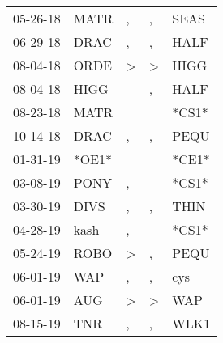 \begin{supertabular}{p{0.07\textwidth}p{0.06\textwidth}p{0.02\textwidth}p{0.02\textwidth}p{0.06\textwidth}}
          05-26-18\textsuperscript{} &           MATR\textsuperscript{} &                , &                , &           SEAS\textsuperscript{} \\
          06-29-18\textsuperscript{} &           DRAC\textsuperscript{} &                , &                , &           HALF\textsuperscript{} \\
          08-04-18\textsuperscript{} &           ORDE\textsuperscript{} &     \textgreater &     \textgreater &           HIGG\textsuperscript{} \\
          08-04-18\textsuperscript{} &           HIGG\textsuperscript{} &                  &                , &           HALF\textsuperscript{} \\
          08-23-18\textsuperscript{} &           MATR\textsuperscript{} &                  &                  &                            *CS1* \\
          10-14-18\textsuperscript{} &           DRAC\textsuperscript{} &                , &                , &           PEQU\textsuperscript{} \\
          01-31-19\textsuperscript{} &                            *OE1* &                  &                  &                            *CE1* \\
          03-08-19\textsuperscript{} &           PONY\textsuperscript{} &                , &                  &                            *CS1* \\
          03-30-19\textsuperscript{} &           DIVS\textsuperscript{} &                , &                , &           THIN\textsuperscript{} \\
          04-28-19\textsuperscript{} &           kash\textsuperscript{} &                , &                  &                            *CS1* \\
          05-24-19\textsuperscript{} &           ROBO\textsuperscript{} &     \textgreater &                , &           PEQU\textsuperscript{} \\
          06-01-19\textsuperscript{} &            WAP\textsuperscript{} &                , &                , &            cys\textsuperscript{} \\
          06-01-19\textsuperscript{} &            AUG\textsuperscript{} &     \textgreater &     \textgreater &            WAP\textsuperscript{} \\
          08-15-19\textsuperscript{} &            TNR\textsuperscript{} &                , &                , &           WLK1\textsuperscript{} \\

\end{supertabular}
